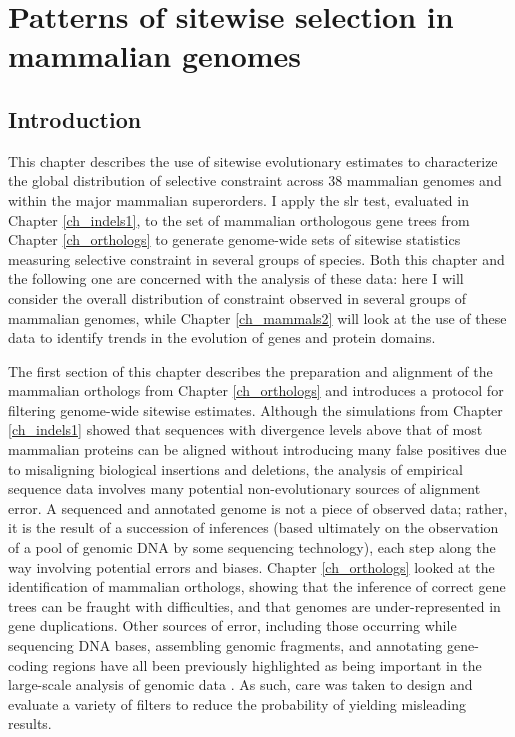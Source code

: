\chapter{Patterns of sitewise selection in mammalian genomes}
\label{ch_mammals1}
\acresetall

\section{Introduction}

This chapter describes the use of sitewise evolutionary estimates to
characterize the global distribution of selective constraint across 38
mammalian genomes and within the major mammalian superorders. I apply
the \ac{slr} test, evaluated in Chapter \ref{ch_indels1}, to the set
of mammalian orthologous gene trees from Chapter \ref{ch_orthologs} to
generate genome-wide sets of sitewise statistics measuring selective
constraint in several groups of \mammln species. Both this chapter and
the following one are concerned with the analysis of these \sw data:
here I will consider the overall distribution of constraint observed
in several groups of mammalian genomes, while Chapter
\ref{ch_mammals2} will look at the use of these \sw data to identify
trends in the evolution of genes and protein domains.

The first section of this chapter describes the preparation and
alignment of the mammalian orthologs from Chapter \ref{ch_orthologs}
and introduces a protocol for filtering genome-wide sitewise
estimates. Although the simulations from Chapter \ref{ch_indels1}
showed that sequences with divergence levels above that of most
mammalian proteins can be aligned without introducing many false
positives due to misaligning biological insertions and deletions, the
analysis of empirical sequence data involves many potential
non-evolutionary sources of alignment error. A sequenced and annotated
genome is not a piece of observed data; rather, it is the result of a
succession of inferences (based ultimately on the observation of a
pool of genomic DNA by some sequencing technology), each step along
the way involving potential errors and biases. Chapter
\ref{ch_orthologs} looked at the identification of mammalian
orthologs, showing that the inference of correct gene trees can be
fraught with difficulties, and that \lcv genomes are under-represented
in gene duplications. Other sources of error, including those
occurring while sequencing DNA bases, assembling genomic fragments,
and annotating gene-coding regions have all been previously
highlighted as being important in the large-scale analysis of genomic
data \citep{TODO}. As such, care was taken to design and evaluate a
variety of filters to reduce the probability of yielding misleading
results.

